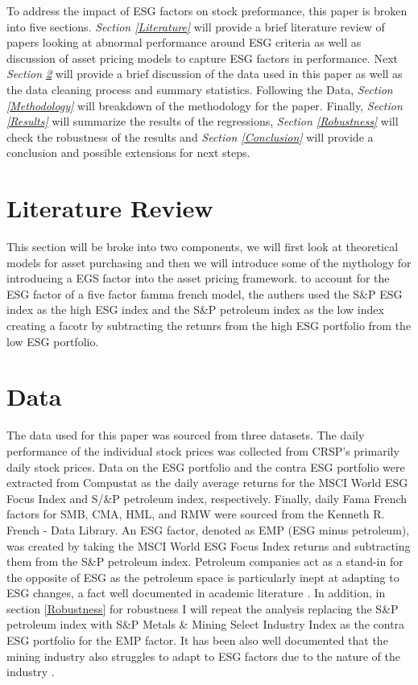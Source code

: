 \documentclass[12pt,oneside,reqno]{amsart}
\begin{document}
To address the impact of ESG factors on stock preformance, this paper is broken into five sections. \textit{Section \ref{Literature}} will provide a  brief literature review of papers looking at abnormal performance around ESG criteria as well as discussion of asset pricing models to capture ESG factors in performance. Next \textit{ Section \ref{Data}}  will provide a brief discussion of the data used in this paper as well as the data cleaning process and summary statistics. Following the Data, \textit{Section \ref{Methodology}} will breakdown of the methodology for the paper. Finally, \textit{Section \ref{Results}}  will summarize the results of the regressions, \textit{Section \ref{Robustness}} will check the robustness of the results and \textit{Section \ref{Conclusion}} will provide a conclusion and possible extensions for next steps. 

\section{Literature Review}
This section will be broke into two components, we will first look at theoretical models for asset purchasing and then we will introduce some of the mythology for introducing a EGS factor into the asset pricing framework.
to account for the ESG factor of a five factor famma french model, the authers used the S\&P ESG index as the high ESG index and the S\&P petroleum index as the low index creating a facotr by subtracting the retunrs from the high ESG portfolio from the low ESG portfolio. \cite{Gregory2020TheGP}
\label{Literature}

\section{Data}
\label{Data}
The data used for this paper was sourced from three datasets. The daily performance of the individual stock prices was collected from CRSP's primarily daily stock prices. Data on the ESG portfolio and the contra ESG portfolio were extracted from Compustat as the daily average returns for the MSCI World ESG Focus Index and S/&P petroleum index, respectively. Finally, daily Fama French factors for SMB, CMA, HML, and RMW were sourced from the Kenneth R. French - Data Library.  An ESG factor, denoted as EMP (ESG minus petroleum), was created by taking the  MSCI World ESG Focus Index returns and subtracting them from the  S\&P petroleum index. Petroleum companies act as a stand-in for the opposite of ESG as the petroleum space is particularly inept at adapting to ESG  changes, a fact well documented in academic literature \cite{Frynas2005TheFD}. In addition, in section \ref{Robustness} for robustness I will repeat the analysis replacing the  S\&P petroleum index with S\&P Metals & Mining Select Industry Index as the contra ESG portfolio for the EMP factor. It has been also well documented that the mining industry also struggles to adapt to ESG factors due to the nature of the industry \cite{Kapelus2002MiningCS}.
\end{document}
